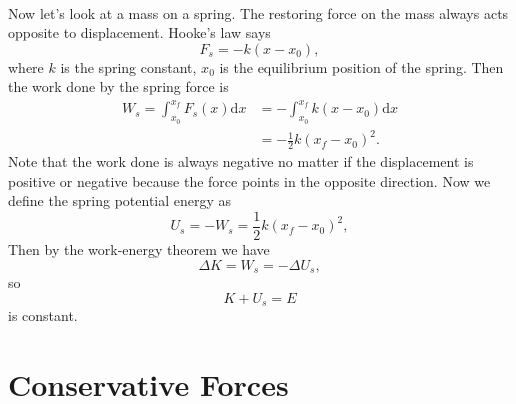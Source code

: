 \documentclass[../classical_mechanics.tex]{subfiles}
\begin{document}
        \paragraph{}
        Now let's look at a mass on a spring. The restoring force on the mass always acts opposite to displacement. Hooke's law says
        \begin{equation}
            F_s = -k(x-x_0),
        \end{equation}
        where $k$ is the spring constant, $x_0$ is the equilibrium position of the spring.
        Then the work done by the spring force is
        \begin{align}
            W_s = \int_{x_0}^{x_f}F_s(x)\mathrm{d}x &= -\int_{x_0}^{x_f}k(x-x_0)\mathrm{d}x\\
            &=-\frac{1}{2}k(x_f-x_0)^2.
        \end{align}
        Note that the work done is always negative no matter if the displacement is positive or negative because the force points in the opposite direction.
        Now we define the spring potential energy as
        \begin{equation}
            U_s = -W_s = \frac{1}{2}k(x_f-x_0)^2,
        \end{equation}
        Then by the work-energy theorem we have
        \begin{equation}
            \Delta K = W_s = -\Delta U_s,
        \end{equation}
        so
        \begin{equation}
            K + U_s = E
        \end{equation}
        is constant.


    \section{Conservative Forces}
\end{document}
